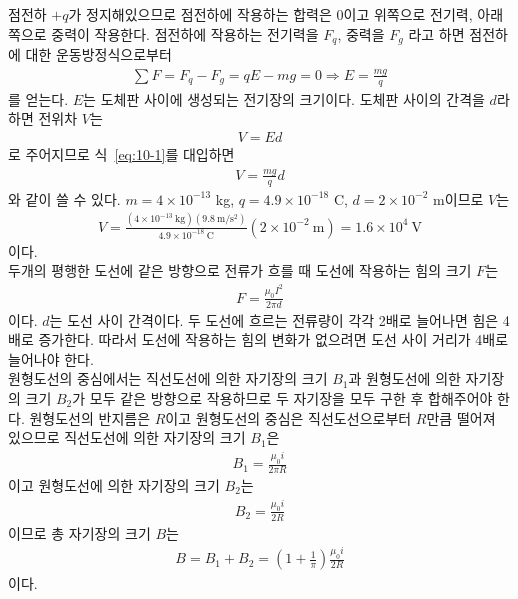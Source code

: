 \documentclass[tightenlines,floatfix,nofootinbib,superscriptaddress,fleqn]{revtex4}
\begin{document}
 점전하 $+q$가 정지해있으므로 점전하에 작용하는 합력은 $0$이고
위쪽으로 전기력, 아래쪽으로 중력이 작용한다. 점전하에 작용하는 전기력을 $F_q$, 중력을 $F_g$
라고 하면 점전하에 대한 운동방정식으로부터
\begin{align}\label{eq:10-1}
  \sum F = F_q - F_g = qE - mg =0\Longrightarrow E= \frac{mg}{q}
\end{align}
를 얻는다. $E$는 도체판 사이에 생성되는 전기장의 크기이다. 도체판 사이의 간격을 $d$라 하면 
전위차 $V$는
\begin{align}
  V = Ed
\end{align}
로 주어지므로 식~\eqref{eq:10-1}를 대입하면
\begin{align}
  V = \frac{mg}{q}d
\end{align}
와 같이 쓸 수 있다. $m = 4\times 10^{-13}$ kg, $q = 4.9 \times 10^{-18}$ C, 
$d = 2\times 10^{-2}$ m이므로 $V$는 
\begin{align}
  V = \frac{(4\times 10^{-13}~\mathrm{kg})(9.8~\mathrm{m/s^2})}
  {4.9 \times 10^{-18}~\mathrm{C}}(2\times 10^{-2}~\mathrm{m})
  =1.6\times 10^4~\mathrm{V}
\end{align}
이다.
\\

두개의 평행한 도선에 같은 방향으로 전류가 흐를 때 도선에 작용하는 힘의 크기 $F$는
\begin{align}
  F = \frac{\mu_0 I^2}{2\pi d}
\end{align}
이다. $d$는 도선 사이 간격이다. 두 도선에 흐르는 전류량이 각각 2배로 늘어나면
힘은 4배로 증가한다. 따라서 도선에 작용하는 힘의 변화가 없으려면 도선 사이 거리가
4배로 늘어나야 한다.
\\

원형도선의 중심에서는 직선도선에 의한 자기장의 크기 $B_1$과 원형도선에 의한 자기장의 크기 
$B_2$가 모두 같은 방향으로 작용하므로 두 자기장을 모두 구한 후 합해주어야 한다. 원형도선의
반지름은 $R$이고 원형도선의 중심은 직선도선으로부터 $R$만큼 떨어져 있으므로
직선도선에 의한 자기장의 크기 $B_1$은
\begin{align}
  B_1 = \frac{\mu_0 i}{2\pi R}
\end{align}
이고 원형도선에 의한 자기장의 크기 $B_2$는
\begin{align}
  B_2 = \frac{\mu_0 i}{2R}
\end{align}
이므로 총 자기장의 크기 $B$는
\begin{align}
  B = B_1+B_2 = \left(1+\frac{1}{\pi}\right)\frac{\mu_0 i}{2R}
\end{align}
이다.
\\
\end{document}
